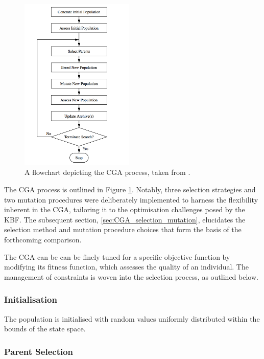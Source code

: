 \documentclass[10pt]{article}
\begin{document}
\begin{multicols}{2}
\begin{figure}[H]
    \centering
    \includegraphics[width=0.48\textwidth]{../figures/Ungenerated Images/Flowchart.png}
    \captionsetup{justification=centering}
    \caption{A flowchart depicting the CGA process, taken from \cite{parks2023geneticalgorithms}.}
    \label{fig:GAprocess}
\end{figure}

The CGA process is outlined in Figure \ref{fig:GAprocess}. Notably, three selection strategies and two mutation procedures were deliberately implemented to harness the flexibility inherent in the CGA, tailoring it to the optimisation challenges posed by the KBF. The subsequent section, \ref{sec:CGA_selection_mutation}, elucidates the selection method and mutation procedure choices that form the basis of the forthcoming comparison.

The CGA can be can be finely tuned for a specific objective function by modifying its fitness function, which assesses the quality of an individual. The management of constraints is woven into the selection process, as outlined below.

\subsubsection{Initialisation}

The population is initialised with random values uniformly distributed within the bounds of the state space.

\subsubsection{Parent Selection}


\end{multicols}
\end{document}
